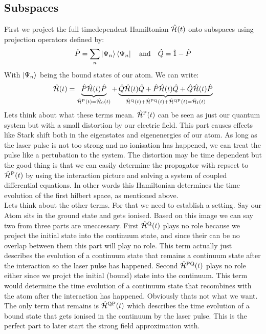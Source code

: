\subsection{Subspaces}
First we project the full timedependent Hamiltonian $\hat{\mathcal{H}}(t)$ onto subspaces using projection operators defined by:
\begin{equation*}
    \hat{P} = \sum_{n}\ket{\Psi_n}\bra{\Psi_n}\quad\text{and}\quad\hat{Q}= \hat{1} - \hat{P}
\end{equation*}
With $\ket{\Psi_n}$ being the bound states of our atom. We can write:
\begin{equation*}
    \hat{\mathcal{H}}(t) = \underbrace{\hat{P}\hat{\mathcal{H}}(t)\hat{P}}_{\hat{\mathcal{H}}^{\mathrm{P}}(t)=\hat{\mathcal{H}}_{\mathrm{0}}(t)} + \underbrace{\hat{Q}\hat{\mathcal{H}}(t)\hat{Q} + \hat{P}\hat{\mathcal{H}}(t)\hat{Q} + \hat{Q}\hat{\mathcal{H}}(t)\hat{P}}_{\hat{\mathcal{H}}^{\mathrm{Q}}(t)+\hat{\mathcal{H}}^{\mathrm{PQ}}(t)+\hat{\mathcal{H}}^{\mathrm{QP}}(t)=\hat{\mathcal{H}}_{\mathrm{I}}(t)}
\end{equation*}
Lets think about what these terms mean. $\hat{\mathcal{H}}^{\mathrm{P}}(t)$ can be seen as just our quantum system but with a small distortion by our electric field. 
This part causes effects like Stark shift both in the eigenstates and eigenenergies of our atom. 
As long as the laser pulse is not too strong and no ionisation has happened, we can treat the pulse like a pertubation to the system.
The distortion may be time dependent but the good thing is that we can easily determine the propagator with repsect to $\hat{\mathcal{H}}^{\mathrm{P}}(t)$ by using the interaction picture and solving a system of coupled differential equations.
In other words this Hamiltonian determines the time evolution of the first hilbert space, as mentioned above. \\
Lets think about the other terms. For that we need to establish a setting. Say our Atom sits in the ground state and gets ionised. 
Based on this image we can say two from three parts are uneccessary. First $\hat{\mathcal{H}}^{\mathrm{Q}}(t)$ plays no role because we project the initial state into the continuum state, and since their can be no overlap between them this part will play no role.
This term actually just describes the evolution of a continuum state that remains a continuum state after the interaction so the laser pulse has happened.
Second $\hat{\mathcal{H}}^{\mathrm{PQ}}(t)$ plays no role either since we projct the initial (bound) state into the continuum. 
This term would determine the time evolution of a continuum state that recombines with the atom after the interaction has happened.
Obviously thats not what we want. 
The only term that remains is $\hat{\mathcal{H}}^{\mathrm{QP}}(t)$ which describes the time evolution of a bound state that gets ionised in the continuum by the laser pulse.
This is the perfect part to later start the strong field approximation with.\\


